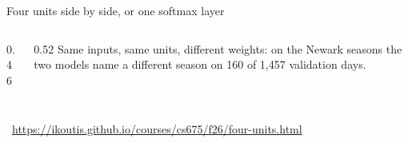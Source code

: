 \documentclass[aspect-ratio=16:9,11pt,frame-title-arg]{ltx-talk}
\begin{document}
\begin{frame}[t]{Four units side by side, or one softmax layer}
\begin{columns}[c]
\begin{column}{0.46\textwidth}
{\begin{tabular}{l|ll}
      \end{tabular}}
    \end{column}
    \begin{column}{0.52\textwidth}
      {\small Same inputs, same units, \alert{different weights}: on the Newark seasons the two models name a different season on 160 of 1{,}457 validation days.}
      \par\vspace{1mm}
      {\scriptsize{}}
    \end{column}
  \end{columns}
  \vspace{1.5mm}
  {\footnotesize{}\ \scriptsize\url{https://ikoutis.github.io/courses/cs675/f26/four-units.html}\par}
\end{frame}
\end{document}
